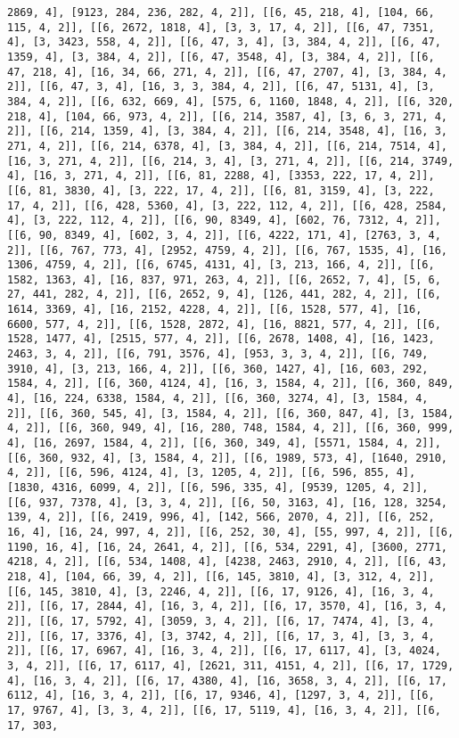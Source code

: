 \documentclass[12pt,fleqn]{article}\usepackage{../../common}
\begin{document}
\begin{verbatim}
2869, 4], [9123, 284, 236, 282, 4, 2]], [[6, 45, 218, 4], [104, 66, 115, 4, 2]], [[6, 2672, 1818, 4], [3, 3, 17, 4, 2]], [[6, 47, 7351, 4], [3, 3423, 558, 4, 2]], [[6, 47, 3, 4], [3, 384, 4, 2]], [[6, 47, 1359, 4], [3, 384, 4, 2]], [[6, 47, 3548, 4], [3, 384, 4, 2]], [[6, 47, 218, 4], [16, 34, 66, 271, 4, 2]], [[6, 47, 2707, 4], [3, 384, 4, 2]], [[6, 47, 3, 4], [16, 3, 3, 384, 4, 2]], [[6, 47, 5131, 4], [3, 384, 4, 2]], [[6, 632, 669, 4], [575, 6, 1160, 1848, 4, 2]], [[6, 320, 218, 4], [104, 66, 973, 4, 2]], [[6, 214, 3587, 4], [3, 6, 3, 271, 4, 2]], [[6, 214, 1359, 4], [3, 384, 4, 2]], [[6, 214, 3548, 4], [16, 3, 271, 4, 2]], [[6, 214, 6378, 4], [3, 384, 4, 2]], [[6, 214, 7514, 4], [16, 3, 271, 4, 2]], [[6, 214, 3, 4], [3, 271, 4, 2]], [[6, 214, 3749, 4], [16, 3, 271, 4, 2]], [[6, 81, 2288, 4], [3353, 222, 17, 4, 2]], [[6, 81, 3830, 4], [3, 222, 17, 4, 2]], [[6, 81, 3159, 4], [3, 222, 17, 4, 2]], [[6, 428, 5360, 4], [3, 222, 112, 4, 2]], [[6, 428, 2584, 4], [3, 222, 112, 4, 2]], [[6, 90, 8349, 4], [602, 76, 7312, 4, 2]], [[6, 90, 8349, 4], [602, 3, 4, 2]], [[6, 4222, 171, 4], [2763, 3, 4, 2]], [[6, 767, 773, 4], [2952, 4759, 4, 2]], [[6, 767, 1535, 4], [16, 1306, 4759, 4, 2]], [[6, 6745, 4131, 4], [3, 213, 166, 4, 2]], [[6, 1582, 1363, 4], [16, 837, 971, 263, 4, 2]], [[6, 2652, 7, 4], [5, 6, 27, 441, 282, 4, 2]], [[6, 2652, 9, 4], [126, 441, 282, 4, 2]], [[6, 1614, 3369, 4], [16, 2152, 4228, 4, 2]], [[6, 1528, 577, 4], [16, 6600, 577, 4, 2]], [[6, 1528, 2872, 4], [16, 8821, 577, 4, 2]], [[6, 1528, 1477, 4], [2515, 577, 4, 2]], [[6, 2678, 1408, 4], [16, 1423, 2463, 3, 4, 2]], [[6, 791, 3576, 4], [953, 3, 3, 4, 2]], [[6, 749, 3910, 4], [3, 213, 166, 4, 2]], [[6, 360, 1427, 4], [16, 603, 292, 1584, 4, 2]], [[6, 360, 4124, 4], [16, 3, 1584, 4, 2]], [[6, 360, 849, 4], [16, 224, 6338, 1584, 4, 2]], [[6, 360, 3274, 4], [3, 1584, 4, 2]], [[6, 360, 545, 4], [3, 1584, 4, 2]], [[6, 360, 847, 4], [3, 1584, 4, 2]], [[6, 360, 949, 4], [16, 280, 748, 1584, 4, 2]], [[6, 360, 999, 4], [16, 2697, 1584, 4, 2]], [[6, 360, 349, 4], [5571, 1584, 4, 2]], [[6, 360, 932, 4], [3, 1584, 4, 2]], [[6, 1989, 573, 4], [1640, 2910, 4, 2]], [[6, 596, 4124, 4], [3, 1205, 4, 2]], [[6, 596, 855, 4], [1830, 4316, 6099, 4, 2]], [[6, 596, 335, 4], [9539, 1205, 4, 2]], [[6, 937, 7378, 4], [3, 3, 4, 2]], [[6, 50, 3163, 4], [16, 128, 3254, 139, 4, 2]], [[6, 2419, 996, 4], [142, 566, 2070, 4, 2]], [[6, 252, 16, 4], [16, 24, 997, 4, 2]], [[6, 252, 30, 4], [55, 997, 4, 2]], [[6, 1190, 16, 4], [16, 24, 2641, 4, 2]], [[6, 534, 2291, 4], [3600, 2771, 4218, 4, 2]], [[6, 534, 1408, 4], [4238, 2463, 2910, 4, 2]], [[6, 43, 218, 4], [104, 66, 39, 4, 2]], [[6, 145, 3810, 4], [3, 312, 4, 2]], [[6, 145, 3810, 4], [3, 2246, 4, 2]], [[6, 17, 9126, 4], [16, 3, 4, 2]], [[6, 17, 2844, 4], [16, 3, 4, 2]], [[6, 17, 3570, 4], [16, 3, 4, 2]], [[6, 17, 5792, 4], [3059, 3, 4, 2]], [[6, 17, 7474, 4], [3, 4, 2]], [[6, 17, 3376, 4], [3, 3742, 4, 2]], [[6, 17, 3, 4], [3, 3, 4, 2]], [[6, 17, 6967, 4], [16, 3, 4, 2]], [[6, 17, 6117, 4], [3, 4024, 3, 4, 2]], [[6, 17, 6117, 4], [2621, 311, 4151, 4, 2]], [[6, 17, 1729, 4], [16, 3, 4, 2]], [[6, 17, 4380, 4], [16, 3658, 3, 4, 2]], [[6, 17, 6112, 4], [16, 3, 4, 2]], [[6, 17, 9346, 4], [1297, 3, 4, 2]], [[6, 17, 9767, 4], [3, 3, 4, 2]], [[6, 17, 5119, 4], [16, 3, 4, 2]], [[6, 17, 303, 
\end{verbatim}
\end{document}
